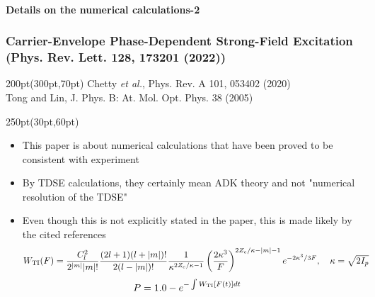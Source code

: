 \begin{frame}
\framesubtitle{Details on the numerical calculations-2}
\frametitle{Carrier-Envelope Phase-Dependent Strong-Field Excitation \\
\small (Phys. Rev. Lett. \textbf{128}, 173201 (2022))}

\footnotesize

\begin{textblock*}{200pt}(300pt,70pt)
\tiny
Chetty \textit{et al.}, Phys. Rev. A 101, 053402 (2020) \\
Tong and Lin, J. Phys. B: At. Mol. Opt. Phys. 38 (2005)
\end{textblock*}

\begin{textblock*}{250pt}(30pt,60pt)
\begin{itemize}
\footnotesize
\item This paper is about numerical calculations that have been proved 
to be consistent with experiment
\item By TDSE calculations, they certainly mean ADK theory and not 
"numerical resolution of the TDSE"
\item Even though this is not explicitly stated in the paper, 
this is made likely by the cited references
\begin{align}
& W_{\rm TI}(F) = \frac{C_l^2}{2^{|m|}|m|!}
\frac{(2l+1)(l+|m|)!}{2(l-|m|)!}
\frac{1}{\kappa^{2Z_c/\kappa-1}}
\left( \frac{2\kappa^3}{F}\right)^{2Z_c/\kappa - |m| - 1}
e^{-2\kappa^3/3F},
\hspace{10pt} \kappa=\sqrt{2I_p} \nonumber
\end{align}
\vspace{30pt}
\begin{align}
& P = 1.0 - e^{-\int W_{\rm TI}[F(t)]dt} \nonumber
\end{align}
\end{itemize}
\end{textblock*}
\end{frame}



